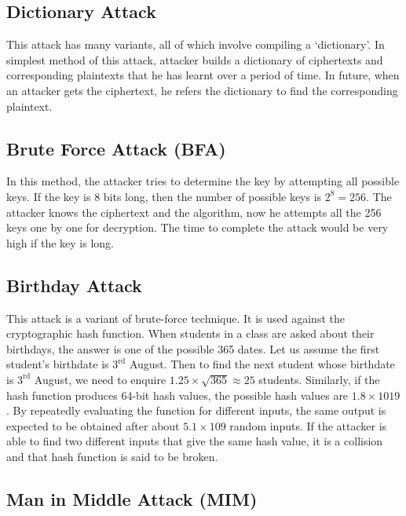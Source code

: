 \documentclass[british]{report}
\begin{document}
\subsection{Dictionary Attack}

This attack has many variants, all of which involve compiling a `dictionary'.
In simplest method of this attack, attacker builds a dictionary of
ciphertexts and corresponding plaintexts that he has learnt over a
period of time. In future, when an attacker gets the ciphertext, he
refers the dictionary to find the corresponding plaintext.

\subsection{Brute Force Attack (BFA)}

In this method, the attacker tries to determine the key by attempting
all possible keys. If the key is 8 bits long, then the number of possible
keys is $2^{8}=256$. The attacker knows the ciphertext and the algorithm,
now he attempts all the 256 keys one by one for decryption. The time
to complete the attack would be very high if the key is long.

\subsection{Birthday Attack}

This attack is a variant of brute-force technique. It is used against
the cryptographic hash function. When students in a class are asked
about their birthdays, the answer is one of the possible 365 dates.
Let us assume the first student's birthdate is $3^{\text{rd}}$ August.
Then to find the next student whose birthdate is $3^{\text{rd}}$
August, we need to enquire ${\displaystyle 1.25\times\sqrt{365}\approx25}$
students. Similarly, if the hash function produces 64-bit hash values,
the possible hash values are $1.8\times1019$. By repeatedly evaluating
the function for different inputs, the same output is expected to
be obtained after about $5.1\times109$ random inputs. If the attacker
is able to find two different inputs that give the same hash value,
it is a collision and that hash function is said to be broken.

\subsection{Man in Middle Attack (MIM)}
\end{document}
